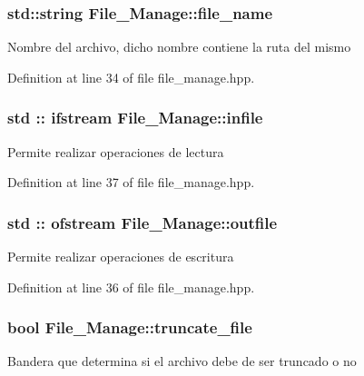 \subsubsection[{\texorpdfstring{file\+\_\+name}{file_name}}]{\setlength{\rightskip}{0pt plus 5cm}std\+::string File\+\_\+\+Manage\+::file\+\_\+name\hspace{0.3cm}{\ttfamily [protected]}}\hypertarget{class_file___manage_a34a7f1a17609e115811efc140a07a018}{}\label{class_file___manage_a34a7f1a17609e115811efc140a07a018}
Nombre del archivo, dicho nombre contiene la ruta del mismo 

Definition at line 34 of file file\+\_\+manage.\+hpp.

\subsubsection[{\texorpdfstring{infile}{infile}}]{\setlength{\rightskip}{0pt plus 5cm}std \+:: ifstream File\+\_\+\+Manage\+::infile\hspace{0.3cm}{\ttfamily [protected]}}\hypertarget{class_file___manage_a8c530b8325a65e290ea3db405f91234a}{}\label{class_file___manage_a8c530b8325a65e290ea3db405f91234a}
Permite realizar operaciones de lectura 

Definition at line 37 of file file\+\_\+manage.\+hpp.

\subsubsection[{\texorpdfstring{outfile}{outfile}}]{\setlength{\rightskip}{0pt plus 5cm}std \+:: ofstream File\+\_\+\+Manage\+::outfile\hspace{0.3cm}{\ttfamily [protected]}}\hypertarget{class_file___manage_ab1ba9c8b82239cec993eff15781ec0be}{}\label{class_file___manage_ab1ba9c8b82239cec993eff15781ec0be}
Permite realizar operaciones de escritura 

Definition at line 36 of file file\+\_\+manage.\+hpp.

\subsubsection[{\texorpdfstring{truncate\+\_\+file}{truncate_file}}]{\setlength{\rightskip}{0pt plus 5cm}bool File\+\_\+\+Manage\+::truncate\+\_\+file\hspace{0.3cm}{\ttfamily [protected]}}\hypertarget{class_file___manage_a598d159493673c0864cd0873816f33a8}{}\label{class_file___manage_a598d159493673c0864cd0873816f33a8}
Bandera que determina si el archivo debe de ser truncado o no 

